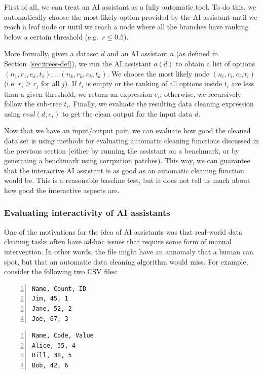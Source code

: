 \documentclass{article}
\begin{document}
First of all, we can treat an AI assistant as a fully automatic tool. To do this, we automatically
choose the most likely option provided by the AI assistant until we reach a leaf node or
until we reach a node where all the branches have ranking below a certain threshold (e.g.~$r\leq 0.5$).

More formally, given a dataset $d$ and an AI assistant $a$ (as defined in Section~\ref{sec:trees-def}), 
we run the AI assistant $a(d)$ to obtain a list of options $(n_1, r_1, e_k, t_1), \ldots (n_k, r_k, e_k, t_k)$.
We choose the most likely node $(n_i, r_i, e_i, t_i)$ (i.e. $r_i \geq r_j$ for all $j$). If 
$t_i$ is empty or the ranking of all options inside $t_i$ are less than a given threshold, we return
an expression $e_i$; otherwise, we recursively follow the sub-tree $t_i$. Finally, we evaluate
the resulting data cleaning expression using $\mathit{eval}(d, e_i)$ to get the clean output for
the input data $d$.

Now that we have an input/output pair, we can evaluate how good the cleaned data set is using 
methods for evaluating automatic cleaning functions discussed in the previous section (either 
by running the assistant on a benchmark, or by generating a benchmark using corrpution patches).
This way, we can guarantee that the interactive AI assistant is as good as an automatic cleaning 
function would be. This is a reasonable baseline test, but it does not tell us much about how
good the interactive aspects are.

\subsubsection{Evaluating interactivity of AI assistants}

One of the motivations for the idea of AI assistants was that real-world data cleaning tasks
often have ad-hoc issues that require some form of manual intervention. In other words, the 
file might have an annomaly that a human can spot, but that an automatic data cleaning algorithm
would miss. For example, consider the following two CSV files:

\vspace{0.5em}
\begin{minipage}[t]{0.5\textwidth}
\begin{Verbatim}[numbers=left,xleftmargin=3mm]
Name, Count, ID
Jim, 45, 1
Jane, 52, 2
Joe, 67, 3
\end{Verbatim}
\end{minipage}
\begin{minipage}[t]{0.5\textwidth}
\begin{Verbatim}[numbers=left,xleftmargin=3mm]
Name, Code, Value
Alice, 35, 4
Bill, 38, 5
Bob, 42, 6
\end{Verbatim}
\end{minipage}
\vspace{0.5em}
\end{document}
